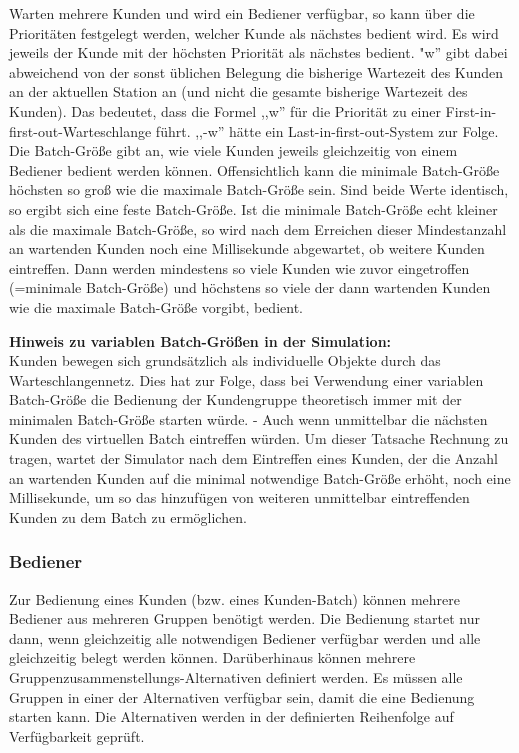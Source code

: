 Warten mehrere Kunden und wird ein Bediener verfügbar, so kann über die Prioritäten festgelegt werden, welcher Kunde als nächstes
bedient wird. Es wird jeweils der Kunde mit der höchsten Priorität als nächstes bedient.
"w'' gibt dabei abweichend von der sonst üblichen Belegung die bisherige Wartezeit des Kunden an der aktuellen Station an (und nicht
die gesamte bisherige Wartezeit des Kunden). Das bedeutet, dass die Formel ,,w'' für die Priorität zu einer
First-in-first-out-Warteschlange führt. ,,-w'' hätte ein Last-in-first-out-System zur Folge.
Die Batch-Größe gibt an, wie viele Kunden jeweils gleichzeitig von einem Bediener bedient werden können. Offensichtlich kann die
minimale Batch-Größe höchsten so groß wie die maximale Batch-Größe sein. Sind beide Werte identisch, so ergibt sich eine feste
Batch-Größe. Ist die minimale Batch-Größe echt kleiner als die maximale Batch-Größe, so wird nach dem Erreichen dieser Mindestanzahl
an wartenden Kunden noch eine Millisekunde abgewartet, ob weitere Kunden eintreffen. Dann werden mindestens so viele Kunden wie zuvor
eingetroffen (=minimale Batch-Größe) und höchstens so viele der dann wartenden Kunden wie die maximale Batch-Größe vorgibt, bedient. 

\textbf{Hinweis zu variablen Batch-Größen in der Simulation:}~\\
Kunden bewegen sich grundsätzlich als individuelle Objekte durch das Warteschlangennetz. Dies hat zur Folge, dass bei Verwendung
einer variablen Batch-Größe die Bedienung der Kundengruppe theoretisch immer mit der minimalen Batch-Größe starten würde. - Auch
wenn unmittelbar die nächsten Kunden des virtuellen Batch eintreffen würden. Um dieser Tatsache Rechnung zu tragen, wartet der
Simulator nach dem Eintreffen eines Kunden, der die Anzahl an wartenden Kunden auf die minimal notwendige Batch-Größe erhöht,
noch eine Millisekunde, um so das hinzufügen von weiteren unmittelbar eintreffenden Kunden zu dem Batch zu ermöglichen.

\subsubsection*{Bediener}

Zur Bedienung eines Kunden (bzw. eines Kunden-Batch) können mehrere Bediener aus mehreren Gruppen benötigt werden. Die Bedienung
startet nur dann, wenn gleichzeitig alle notwendigen Bediener verfügbar werden und alle gleichzeitig belegt werden können.
Darüberhinaus können mehrere Gruppenzusammenstellungs-Alternativen definiert werden. Es müssen alle Gruppen in einer der
Alternativen verfügbar sein, damit die eine Bedienung starten kann. Die Alternativen werden in der definierten Reihenfolge
auf Verfügbarkeit geprüft. 

